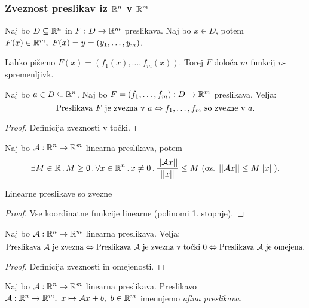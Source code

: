 \newpage
\subsubsection{Zveznost preslikav iz $\mathbb{R}^n$ v $\mathbb{R}^m$}
Naj bo $D \subseteq \mathbb{R}^n$ in $F: D \to \mathbb{R}^m$ preslikava. Naj bo $x \in D$, potem $F(x) \in \mathbb{R}^m, \ F(x) = y = (y_1, \ldots, y_m)$.

Lahko pišemo $F(x) = (f_1(x), \ldots, f_m(x))$. Torej $F$ določa $m$ funkcij $n$-spremenljivk.

\begin{trditev}
    Naj bo $a \in D \subseteq \mathbb{R}^n$. Naj bo $F=(f_1, \ldots, f_m): D \to \mathbb{R}^m$ preslikava. Velja:
    $$\text{Preslikava } F \text{ je zvezna v } a \Leftrightarrow f_1,\ldots, f_m \text{ so zvezne v } a.$$
\end{trditev}

\begin{proof}
    Definicija zveznosti v točki.
\end{proof}

\begin{zgled}
    Naj bo $\mathcal{A}: \mathbb{R}^n \to \mathbb{R}^m$ linearna preslikava, potem $$\exists  M \in \mathbb{R} \, . \, M \geq 0 \,.\, \forall x \in \mathbb{R}^n \, . \, x \neq 0  \,.\,  \frac{||\mathcal{A}x||}{||x||} \leq M \ (\text{oz. } ||\mathcal{A}x|| \leq M ||x|| ).$$
\end{zgled}

\begin{trditev}
    Linearne preslikave so zvezne
\end{trditev}

\begin{proof}
    Vse koordinatne funkcije linearne (polinomi 1. stopnje).
\end{proof}

\begin{trditev}
    Naj bo $\mathcal{A}: \mathbb{R}^n \to \mathbb{R}^m$ linearna preslikava. Velja:
    $$\text{Preslikava } \mathcal{A} \text{ je zvezna} \Leftrightarrow \text{Preslikava } \mathcal{A} \text{ je zvezna v točki } 0 \Leftrightarrow \text{Preslikava } \mathcal{A} \text{ je omejena}.$$
\end{trditev}

\begin{proof}
    Definicija zveznosti in omejenosti.
\end{proof}

\begin{definicija}
    Naj bo $\mathcal{A}: \mathbb{R}^n \to \mathbb{R}^m$ linearna preslikava. Preslikavo $\mathcal{A}: \mathbb{R}^n \to \mathbb{R}^m, \ x \mapsto \mathcal{A}x + b, \ b \in \mathbb{R}^m$ imenujemo \emph{afina preslikava}.
\end{definicija}

